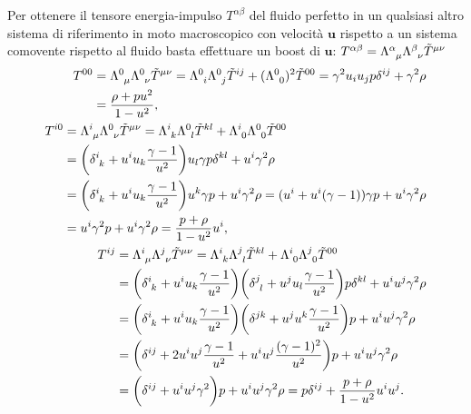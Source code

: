 Per ottenere il tensore energia-impulso $T^{\alpha\beta}$ del fluido perfetto in
un qualsiasi altro sistema di riferimento in moto macroscopico con velocità
$\bm{u}$ rispetto a un sistema comovente rispetto al fluido basta effettuare un
boost di $\bm{u}$:
$T^{\alpha\beta} =
\tensor{\Lambda}{^{\alpha}_{\mu}}\tensor{\Lambda}{^{\beta}_{\nu}}\tilde
T^{\mu\nu}$
\begin{subequations}
  \begin{align}
    \begin{split}
      T^{00} &= \tensor{\Lambda}{^{0}_{\mu}} \tensor{\Lambda}{^{0}_{\nu}} \tilde
      T^{\mu\nu} = \tensor{\Lambda}{^{0}_{i}} \tensor{\Lambda}{^{0}_{j}} \tilde
      T^{ij} + (\tensor{\Lambda}{^{0}_{0}})^{2} \tilde T^{00} = \gamma^{2} u_{i}
      u_{j} p \delta^{ij} + \gamma^{2} \rho \\
      &= \frac{\rho +pu^{2}}{1-u^{2}},
    \end{split} \\
    \begin{split}
      T^{i0} &= \tensor{\Lambda}{^{i}_{\mu}} \tensor{\Lambda}{^{0}_{\nu}} \tilde
      T^{\mu\nu} = \tensor{\Lambda}{^{i}_{k}} \tensor{\Lambda}{^{0}_{l}} \tilde
      T^{kl} + \tensor{\Lambda}{^{i}_{0}} \tensor{\Lambda}{^{0}_{0}} \tilde
      T^{00} \\
      &= \bigg(\tensor{\delta}{^{i}_{k}} + u^{i}u_{k}\frac{\gamma -
        1}{u^{2}}\bigg) u_{l} \gamma p \delta^{kl} + u^{i} \gamma^{2} \rho \\
      &= \bigg(\tensor{\delta}{^{i}_{k}} + u^{i}u_{k}\frac{\gamma - 1}{u^{2}}\bigg)
      u^{k} \gamma p + u^{i} \gamma^{2} \rho = (u^{i} + u^{i}(\gamma - 1))
      \gamma p + u^{i} \gamma^{2} \rho \\
      &= u^{i}\gamma^{2} p + u^{i} \gamma^{2} \rho = \frac{p + \rho}{1 -
        u^{2}}u^{i},
    \end{split} \\
    \begin{split}
      T^{ij} &= \tensor{\Lambda}{^{i}_{\mu}} \tensor{\Lambda}{^{j}_{\nu}} \tilde
      T^{\mu\nu} = \tensor{\Lambda}{^{i}_{k}} \tensor{\Lambda}{^{j}_{l}} \tilde
      T^{kl} + \tensor{\Lambda}{^{i}_{0}} \tensor{\Lambda}{^{j}_{0}} \tilde
      T^{00} \\
      &= \bigg(\tensor{\delta}{^{i}_{k}} + u^{i}u_{k}\frac{\gamma -
        1}{u^{2}}\bigg) \bigg(\tensor{\delta}{^{j}_{l}} + u^{j}u_{l}\frac{\gamma
        - 1}{u^{2}}\bigg) p \delta^{kl} + u^{i}u^{j} \gamma^{2} \rho \\
      &= \bigg(\tensor{\delta}{^{i}_{k}} + u^{i}u_{k}\frac{\gamma -
        1}{u^{2}}\bigg) \bigg(\delta^{jk} + u^{j}u^{k}\frac{\gamma -
        1}{u^{2}}\bigg) p + u^{i}u^{j} \gamma^{2} \rho \\
      &= \bigg(\delta^{ij} + 2 u^{i}u^{j} \frac{\gamma - 1}{u^{2}} +
      u^{i}u^{j}\frac{(\gamma - 1)^{2}}{u^{2}}\bigg)p + u^{i}u^{j} \gamma^{2}
      \rho \\
      &= \bigg(\delta^{ij} + u^{i}u^{j}\gamma^{2}\bigg)p + u^{i}u^{j} \gamma^{2}
      \rho = p \delta^{ij} + \frac{p + \rho}{1 - u^{2}}u^{i}u^{j}.
    \end{split}
  \end{align}
\end{subequations}
